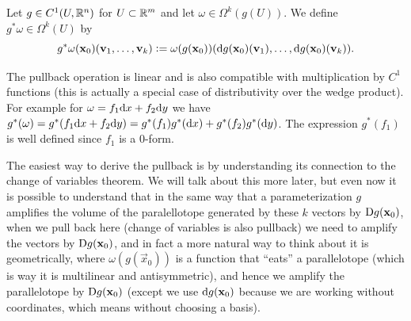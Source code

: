 \documentclass[11pt,a4paper]{article}
\begin{document}
\begin{definition}[Pullback]
  Let $g \in C^1(U,\mathbb{R}^n)$ for $U \subset \mathbb{R}^m$ and let
  $\omega \in \Omega^k(g(U))$.
  We define $g^*\omega \in \Omega^k(U)$ by
  \[
    g^*\omega(\boldsymbol{\mathbf{x}}_0)(\boldsymbol{\mathbf{v}}_1,\dots,\boldsymbol{\mathbf{v}}_k) :=
    \omega(g(\boldsymbol{\mathbf{x}}_0))
    (\mathrm{d} g(\boldsymbol{\mathbf{x}}_0)(\boldsymbol{\mathbf{v}}_1),\dots,\mathrm{d} g(\boldsymbol{\mathbf{x}}_0)(\boldsymbol{\mathbf{v}}_k)).
  \]
\end{definition}
\begin{remark}
  The pullback operation is linear and is also compatible
  with multiplication by $C^1$ functions (this
  is actually a special case of distributivity over the wedge product).
  For example for $\omega = f_1 \dx + f_2 \dy$
  we have $g^*(\omega) = g^*(f_1 \dx + f_2 \dy) =
  g^*(f_1) g^*(\dx) + g^*(f_2) g^*(\dy)$.
  The expression $g^*(f_1)$ is well defined since $f_1$
  is a $0$-form.
\end{remark}
\begin{remark}
  The easiest way to derive the pullback is by understanding its connection
  to the change of variables theorem.
  We will talk about this more later,
  but even now it is possible to understand that in the same way that
  a parameterization $g$ amplifies the volume of the paralellotope
  generated by these $k$ vectors by $\mathrm{D} g(\boldsymbol{\mathbf{x}}_0)$,
  when we pull back here (change of variables is also pullback)
  we need to amplify the vectors by $\mathrm{D} g(\boldsymbol{\mathbf{x}}_0)$,
  and in fact a more natural way to think about it is geometrically,
  where $\omega(g(\vec x_0))$ is a function that ``eats'' a
  parallelotope (which is way it is multilinear and antisymmetric),
  and hence we amplify the parallelotope by $\mathrm{D} g(\boldsymbol{\mathbf{x}}_0)$
  (except we use $\mathrm{d} g(\boldsymbol{\mathbf{x}}_0)$ because we are working without coordinates,
  which means without choosing a basis).
\end{remark}
\end{document}
